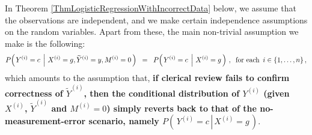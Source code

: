 \vskip0.5cm
\begin{remark}
\mbox{}\vskip 0.1cm\noindent
In Theorem \ref{ThmLogisticRegressionWithIncorrectData} below,
we assume that the observations are independent, and
we make certain independence assumptions on the random variables.
Apart from these, the main non-trivial assumption we make is the following:
\begin{equation*}
P\!\left(\left.Y^{(i)} = c\,\;\right\vert\,X^{(i)}=g,\widetilde{Y}^{(i)}=y,M^{(i)}=0\,\right)
\;\; = \;\;
P\!\left(\left.Y^{(i)} = c\,\;\right\vert\,X^{(i)}=g\,\right)\,,
\;\;
\textnormal{for each \,$i\in\{1,\ldots,n\}$}\,,
\end{equation*}
which amounts to the assumption that,
\textbf{\color{red}if clerical review fails to confirm correctness of $\widetilde{Y}^{(i)}$,
then the conditional distribution of $Y^{(i)}$ (given $X^{(i)}$, $\widetilde{Y}^{(i)}$ and $M^{(i)}=0$)
simply reverts back to that of the no-measurement-error scenario,
namely $P\!\left(\,\left.Y^{(i)}=c\,\right\vert\,X^{(i)}=g\,\right)$}.
\end{remark}

